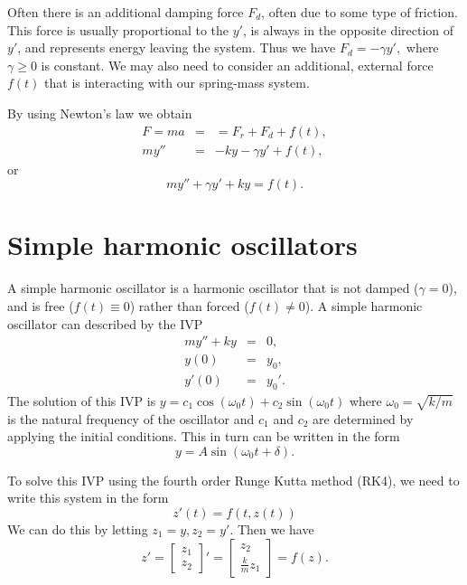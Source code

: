 Often there is an additional damping force $F_d$, often due to some type of friction. This force is usually proportional to the $y'$, is always in the opposite direction of $y'$, and represents energy leaving the system. 
Thus we have $F_d = -\gamma y', $ where $ \gamma \geq 0$ is constant. 
We may also need to consider an additional, external force $f(t)$ that is interacting with our spring-mass system.
 

By using Newton's law we obtain
\begin{eqnarray*}
F = ma &=&= F_r + F_d + f(t),\\
my'' &=& -ky -\gamma y' + f(t),
\end{eqnarray*}
or 
\[my''+\gamma y' + ky = f(t). \]


\section*{Simple harmonic oscillators}
A simple harmonic oscillator is a harmonic oscillator that is not damped ($\gamma =0$), and is free ($f(t) \equiv 0$) rather than forced ($f(t) \not = 0$). A simple harmonic oscillator can described by the IVP
\begin{eqnarray*}
my'' + ky &=& 0,\\
y(0) &=& y_0,\\
y'(0) &=& y_0'.
\end{eqnarray*} 
The solution of this IVP is $y = c_1\cos (\omega_0 t) + c_2 \sin (\omega_0 t)$ where $\omega_0 = \sqrt{k/m}$ is the natural frequency of the oscillator and $c_1$ and $c_2$ are determined by applying the initial conditions. This in turn can be written in the form 
\[y = A\sin (\omega_0 t + \delta) .\]

To solve this IVP using the fourth order Runge Kutta method (RK4), we need to write this system in the form 
\[z'(t) = f(t,z(t)) \]
We can do this by letting $z_1 = y, z_2 = y'$. Then we have 
\[     z'=  \left[\begin{array}{c}z_1 \\z_2\end{array}\right]'  =  \left[\begin{array}{c}z_2 \\\frac{k}{m}z_1\end{array}\right]= f(z).\]

